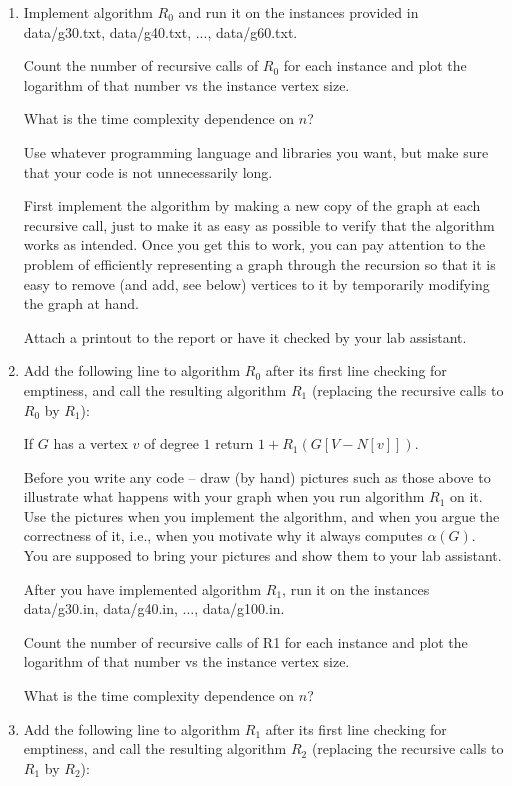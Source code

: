 \documentclass{tufte-handout}
\begin{document}
\begin{enumerate}
\item Implement algorithm $R_0$ and run it on the instances provided in
  data/g30.txt, data/g40.txt, ..., data/g60.txt.
  
  Count the number of recursive calls of $R_0$ for each instance and plot the
  logarithm of that number vs the instance vertex size. 
  
  What is the time complexity dependence on $n$?
  
  Use whatever programming language and libraries you want, but make
  sure that your code is not unnecessarily long.

  First implement the algorithm by making a new copy of the graph at
  each recursive call, just to make it as easy as possible to verify
  that the algorithm works as intended. Once you get this to work, you
  can pay attention to the problem of efficiently representing a graph
  through the recursion so that it is easy to remove (and add, see
  below) vertices to it by temporarily modifying the graph at hand.
   
  Attach a printout to the report or have it checked by your lab
  assistant.

\item Add the following line to algorithm $R_0$ after its first line
 checking for emptiness, and call the resulting algorithm $R_1$
 (replacing the recursive calls to $R_0$ by $R_1$):
 
 If $G$ has a vertex $v$ of degree $1$ return $1+R_1(G[V-N[v]])$.
 
 Before you write any code -- draw (by hand) pictures such as those
 above to illustrate what happens with your graph when you run
 algorithm $R_1$ on it. Use the pictures when you implement the
 algorithm, and when you argue the correctness of it, i.e., when you
 motivate why it always computes $\alpha(G)$. You are supposed to
 bring your pictures and show them to your lab assistant.
 
 After you have implemented algorithm $R_1$, run it on the instances
 data/g30.in, data/g40.in, $\ldots$, data/g100.in.

  Count the number of recursive calls of R1 for each instance and plot the
  logarithm of that number vs the instance vertex size.
  
  What is the time complexity dependence on $n$?

\item Add the following line to algorithm $R_1$ after its first line
  checking for emptiness, and call the resulting algorithm $R_2$
  (replacing the recursive calls to $R_1$ by $R_2$):
 

\end{enumerate}
\end{document}
